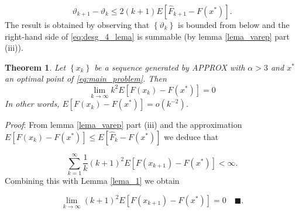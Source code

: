 \documentclass{article}
\newcommand{\x}{x^*}
\newtheorem{Teo}{Theorem}
\begin{document}
\begin{equation}
\label{eq:desg_4_lema}
\vartheta_{k+1} - \vartheta_k \leq 2(k+1)E\left[\hat{F}_{k+1}-F(\x)\right].
\end{equation}
The result is obtained by observing that $\left\lbrace \vartheta_k \right\rbrace$ is bounded from below and the right-hand side of \eqref{eq:desg_4_lema} is summable (by lemma \ref{lema_varep} part (iii)).


\begin{Teo}
Let $\left\lbrace x_k \right\rbrace$ be a sequence generated by APPROX with $\alpha > 3$ and $\x$ an optimal point of \eqref{eq:main_problem}. Then
	\begin{equation*}
		\lim_{k \rightarrow \infty} k^2 E \left[F(x_k) - F(\x) \right] = 0
	\end{equation*}
In other words, $E\left[F(x_k) - F(\x) \right] = o\left(k^{-2} \right)$.
\end{Teo}

\emph{Proof}: From lemma \ref{lema_varep} part (iii) and the approximation $E\left[ F(x_k)-F(\x) \right] \leq E\left[ \hat{F}_k - F(\x) \right]$ we deduce that

\begin{equation}
	\sum_{k=1}^{\infty} \frac{1}{k} (k+1)^2 E\left[ F(x_{k+1}) - F(\x) \right] < \infty.
\end{equation}
Combining this with Lemma \ref{lema_1} we obtain	

\begin{equation}
	\lim_{k \rightarrow \infty} (k+1)^2 E\left[F(x_{k+1})-F(\x) \right] = 0 \quad \blacksquare.
\end{equation}


\newpage

\nocite{*}


\end{document}
